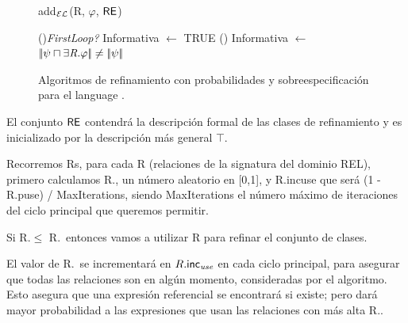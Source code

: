 \begin{figure}[!t]
\begin{algorithm}[H]
\dontprintsemicolon
\caption{add$_\mathcal{EL}$(R, $\varphi$, $\RE$)} \label{algo:bisim-add-el-over}
\KwOut{\footnotesize $\RE$}

\If(){\em FirstLoop?}{
    Informativa $\leftarrow$ TRUE }
\lElse() {Informativa $\leftarrow$ $|\!|\psi \sqcap \exists \mbox{\em R}.\varphi|\!| \neq |\!|\psi|\!|$} 
\end{algorithm}
\vspace*{-.5cm}\caption{Algoritmos de refinamiento con probabilidades y sobreespecificaci\'on para el language \el.}\label{fig:algo3}

\end{figure}

El conjunto $\RE$ contendr\'a la descripci\'on formal de las clases de refinamiento
y es inicializado por la descripci\'on m\'as general $\top$.

Recorremos Rs, para cada R (relaciones de la signatura del dominio REL), primero calculamos R.\randomuse, un n\'umero aleatorio en [0,1], y R.incuse que ser\'a (1 -R.puse) / MaxIterations, siendo MaxIterations el n\'umero m\'aximo de iteraciones del ciclo principal que queremos permitir.

Si R.\randomuse $\le$ R.\puse\ entonces vamos a utilizar R para refinar el conjunto de
clases. 

El valor de R.\puse\ se incrementar\'a en $R.\textsf{inc}_\emph{use}$
en cada ciclo principal, para asegurar que todas las relaciones son en alg\'un momento,
consideradas por el algoritmo. Esto asegura que una expresi\'on referencial
se encontrar\'a si existe; pero dar\'a mayor probabilidad a las expresiones
que usan las relaciones con m\'as alta R.\puse.
 
